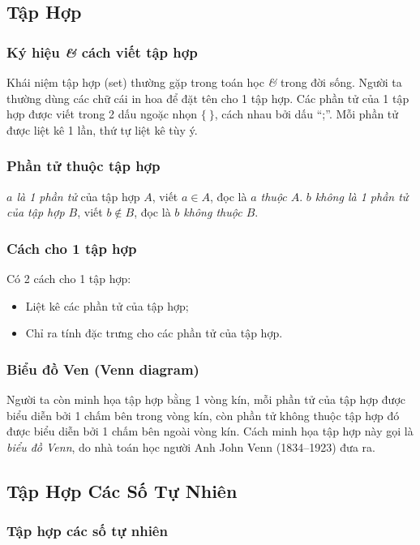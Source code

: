 \documentclass{article}
\numberwithin{equation}{section}
\begin{document}
\subsection{Tập Hợp}

\subsubsection{Ký hiệu \textit{\&} cách viết tập hợp}
Khái niệm tập hợp (set) thường gặp trong toán học \textit{\&} trong đời sống. Người ta thường dùng các chữ cái in hoa để đặt tên cho 1 tập hợp. Các phần tử của 1 tập hợp được viết trong 2 dấu ngoặc nhọn $\{\ \}$, cách nhau bởi dấu ``;''. Mỗi phần tử được liệt kê 1 lần, thứ tự liệt kê tùy ý.

\subsubsection{Phần tử thuộc tập hợp}
\textit{$a$ là 1 phần tử} của tập hợp $A$, viết $a\in A$, đọc là \textit{$a$ thuộc $A$}. \textit{$b$ không là 1 phần tử của tập hợp $B$}, viết $b\notin B$, đọc là \textit{$b$ không thuộc $B$}.

\subsubsection{Cách cho 1 tập hợp}
Có 2 cách cho 1 tập hợp:
\begin{itemize}
	\item Liệt kê các phần tử của tập hợp;
	\item Chỉ ra tính đặc trưng cho các phần tử của tập hợp.
\end{itemize}

\subsubsection{Biểu đồ Ven (Venn diagram)}
Người ta còn minh họa tập hợp bằng 1 vòng kín, mỗi phần tử của tập hợp được biểu diễn bởi 1 chấm bên trong vòng kín, còn phần tử không thuộc tập hợp đó được biểu diễn bởi 1 chấm bên ngoài vòng kín. Cách minh họa tập hợp này gọi là \textit{biểu đồ Venn}, do nhà toán học người Anh John Venn (1834--1923) đưa ra.

\subsection{Tập Hợp Các Số Tự Nhiên}

\subsubsection{Tập hợp các số tự nhiên}
\end{document}
